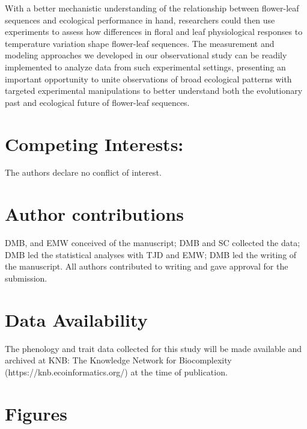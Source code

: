 \documentclass{article}[12pt]
\begin{document}
With a better mechanistic understanding of the relationship between flower-leaf sequences and ecological performance in hand, researchers could then use experiments to assess how differences in floral and leaf physiological responses to temperature variation shape flower-leaf sequences. The measurement and modeling approaches we developed in our observational study can be readily implemented to analyze data from such experimental settings, presenting an important opportunity to unite observations of broad ecological patterns with targeted experimental manipulations to better understand both the evolutionary past and ecological future of flower-leaf sequences.


\section*{Competing Interests:}
The authors declare no conflict of interest.

\section*{Author contributions}
DMB, and EMW conceived of the manuscript; DMB and SC collected the data; DMB led the statistical analyses with TJD and EMW; DMB led the writing of the manuscript. All authors contributed to writing and gave approval for the submission.

\section*{Data Availability}
The phenology and trait data collected for this study will be made available and archived at KNB: The Knowledge Network for Biocomplexity (https://knb.ecoinformatics.org/) at the time of publication.


 

\newpage
\section*{Figures}
\end{document}
